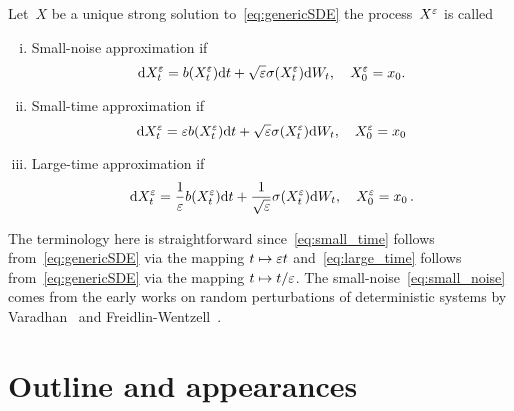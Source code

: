 \begin{definition}\label{def:LDP_approximation_types}
Let~$X$ be a unique strong solution to~\eqref{eq:genericSDE} the process~$X^\varepsilon$ is called
\begin{enumerate}[i)]
\item Small-noise approximation if 
\begin{equation}\label{eq:small_noise}
\mathrm{d} X_t^\varepsilon = b(X_t^\varepsilon) \mathrm{d} t + \sqrt{\varepsilon} \sigma(X_t^\varepsilon)\mathrm{d} W_t, \quad X_0^\varepsilon = x_0.
\end{equation}
\item Small-time approximation if 
\begin{equation}\label{eq:small_time}
\mathrm{d} X_t^\varepsilon = \varepsilon b(X_t^\varepsilon) \mathrm{d} t + \sqrt{\varepsilon} \sigma(X_t^\varepsilon) \mathrm{d} W_t, \quad X_0^\varepsilon = x_0
\end{equation}
\item Large-time approximation if 
\begin{equation}\label{eq:large_time}
\mathrm{d} X_t^\varepsilon = \frac{1}{\varepsilon} b(X_t^\varepsilon) \mathrm{d} t + \frac{1}{\sqrt{\varepsilon}} \sigma(X_t^\varepsilon) \mathrm{d} W_t, \quad X_0^\varepsilon = x_0\,.
\end{equation}
\end{enumerate}
\end{definition}
The terminology here is straightforward since~\eqref{eq:small_time} follows from~\eqref{eq:genericSDE} via the mapping $t \mapsto \varepsilon t$
and~\eqref{eq:large_time} follows from~\eqref{eq:genericSDE} via the mapping
$t\mapsto t/\varepsilon$.
The small-noise~\eqref{eq:small_noise}
comes from the early works 
on random perturbations of deterministic systems by Varadhan~\cite{Varadhan1967DiffusionInterval} and Freidlin-Wentzell~\cite{Freidlin2012RandomSystems}.


\section{Outline and appearances}

